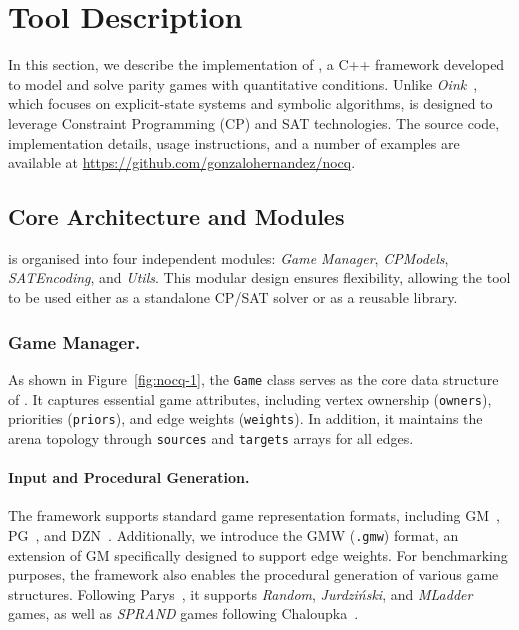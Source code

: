 \documentclass[runningheads]{llncs}
\begin{document}
\section{Tool Description}

In this section, we describe the implementation of \nocq, a C++ framework developed to model and solve parity games with quantitative conditions. Unlike \emph{Oink}~\cite{vanDijk:2018}, which focuses on explicit-state systems and symbolic algorithms, \nocq is designed to leverage Constraint Programming (CP) and SAT technologies. The source code, implementation details, usage instructions, and a number of examples are available at \url{https://github.com/gonzalohernandez/nocq}.

\subsection*{Core Architecture and Modules}

\nocq is organised into four independent modules: \emph{Game Manager}, \emph{CPModels}, \emph{SATEncoding}, and \emph{Utils}. This modular design ensures flexibility, allowing the tool to be used either as a standalone CP/SAT solver or as a reusable library.


\subsubsection*{Game Manager.}

As shown in Figure~\ref{fig:nocq-1}, the \texttt{Game} class serves as the core data structure of \nocq. It captures essential game attributes, including vertex ownership (\texttt{owners}), priorities (\texttt{priors}), and edge weights (\texttt{weights}). In addition, it maintains the arena topology through \texttt{sources} and \texttt{targets} arrays for all edges.

\paragraph{Input and Procedural Generation.}
The framework supports standard game representation formats, including GM~\cite{Parys:2019}, PG~\cite{vanDijk:2018}, and DZN~\cite{Minizinc:2020}. Additionally, we introduce the GMW (\texttt{.gmw}) format, an extension of GM specifically designed to support edge weights. 
For benchmarking purposes, the framework also enables the procedural generation of various game structures. Following Parys~\cite{Parys:2019}, it supports \emph{Random}, \emph{Jurdziński}, and \emph{MLadder} games, as well as \emph{SPRAND} games following Chaloupka~\cite{Chaloupka:2011}.
\end{document}
